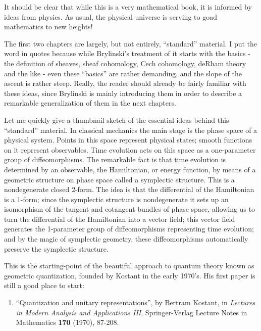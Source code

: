 \documentclass{article}
\def\tightlist{}
\begin{document}
It should be clear that while this is a very mathematical book, it is
informed by ideas from physics. As usual, the physical universe is
serving to goad mathematics to new heights!

The first two chapters are largely, but not entirely, ``standard''
material. I put the word in quotes because while Brylinski's treatment
of it starts with the basics - the definition of sheaves, sheaf
cohomology, Cech cohomology, deRham theory and the like - even these
``basics'' are rather demanding, and the slope of the ascent is rather
steep. Really, the reader should already be fairly familiar with these
ideas, since Brylinski is mainly introducing them in order to describe a
remarkable generalization of them in the next chapters.

Let me quickly give a thumbnail sketch of the essential ideas behind
this ``standard'' material. In classical mechanics the main stage is the
phase space of a physical system. Points in this space represent
physical states; smooth functions on it represent observables. Time
evolution acts on this space as a one-parameter group of
diffeomorphisms. The remarkable fact is that time evolution is
determined by an observable, the Hamiltonian, or energy function, by
means of a geometric structure on phase space called a symplectic
structure. This is a nondegenerate closed 2-form. The idea is that the
differential of the Hamiltonian is a 1-form; since the symplectic
structure is nondegenerate it sets up an isomorphism of the tangent and
cotangent bundles of phase space, allowing us to turn the differential
of the Hamiltonian into a vector field; this vector field generates the
1-parameter group of diffeomorphisms representing time evolution; and by
the magic of symplectic geometry, these diffeomorphisms automatically
preserve the symplectic structure.

This is the starting-point of the beautiful approach to quantum theory
known as geometric quantization, founded by Kostant in the early 1970's.
His first paper is still a good place to start:

\begin{enumerate}
\def\labelenumi{\arabic{enumi})}
\setcounter{enumi}{1}
\tightlist
\item
  ``Quantization and unitary representations'', by Bertram Kostant, in
  \emph{Lectures in Modern Analysis and Applications III},
  Springer-Verlag Lecture Notes in Mathematics \textbf{170} (1970),
  87-208.
\end{enumerate}
\end{document}
